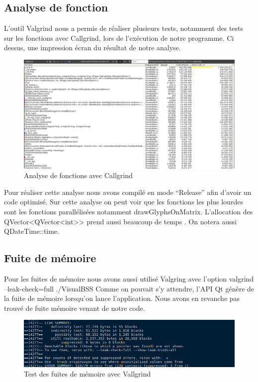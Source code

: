 \documentclass[12pt]{article}
\begin{document}
	\subsection{Analyse de fonction}
	L’outil Valgrind nous a permis de réaliser plusieurs tests, notamment des tests sur les
	fonctions avec Callgrind, lors de l'exécution de notre programme. Ci dessus, une
	impression écran du résultat de notre analyse.
	
	\begin{figure}[!h]
	\begin{center}
	\includegraphics[scale=.35]{callgrind_analyse.png}
	\caption{Analyse de fonctions avec Callgrind}
	\end{center}
	\end{figure}
	
	Pour réaliser cette analyse nous avons compilé en mode “Release” afin d’avoir un code optimisé.
	Sur cette analyse on peut voir que les fonctions les plus lourdes sont les fonctions
	parallélisées notamment drawGlyphsOnMatrix. L’allocation des QVector<QVector<int>>
	prend aussi beaucoup de temps . On notera aussi QDateTime::time.
		
	\subsection{Fuite de mémoire}
	Pour les fuites de mémoire nous avons aussi utilisé Valgring avec l’option
	valgrind --leak-check=full ./VisualBSS
	Comme on pouvait s’y attendre, l’API Qt génère de la fuite de mémoire
	lorsqu’on lance l’application.
	Nous avons en revanche pas trouvé de fuite mémoire venant de notre code.
	
	\begin{figure}[!h]
	\begin{center}
	\includegraphics[scale=.5]{memory_leak.png}
	\caption{Test des fuites de mémoire avec Vallgrind}
	\end{center}
	\end{figure}
\end{document}
